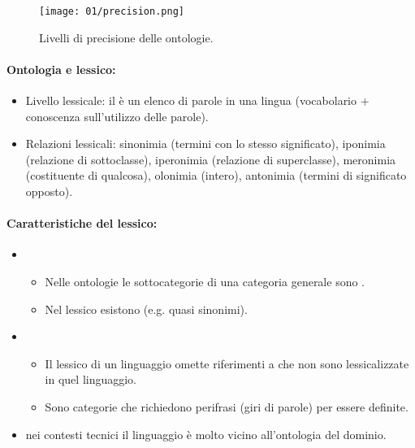 \begin{figure}[h]
    \centering
    \texttt{[image: 01/precision.png]}
    \caption{Livelli di precisione delle ontologie.}
\end{figure}

\paragraph{Ontologia e lessico:}

\begin{itemize}
  \item Livello lessicale: il  è un elenco di parole in una lingua (vocabolario + conoscenza sull'utilizzo delle parole). 
  \item Relazioni lessicali: sinonimia (termini con lo stesso significato), iponimia (relazione di sottoclasse), iperonimia (relazione di superclasse), meronimia (costituente di qualcosa), olonimia (intero), antonimia (termini di significato opposto).
\end{itemize}


\paragraph{Caratteristiche del lessico:}

\begin{itemize}
  \item {}
    \begin{itemize}
      \item Nelle ontologie le sottocategorie di una categoria generale sono . 
      \item Nel lessico esistono  (e.g. quasi sinonimi).
    \end{itemize}
  \item {} 
    \begin{itemize}
      \item Il lessico di un linguaggio omette riferimenti a  che non sono lessicalizzate in quel linguaggio. 
      \item Sono categorie che richiedono perifrasi (giri di parole) per essere definite.
    \end{itemize}
  \item {} nei contesti tecnici il linguaggio è molto vicino all'ontologia del dominio. 
\end{itemize}


